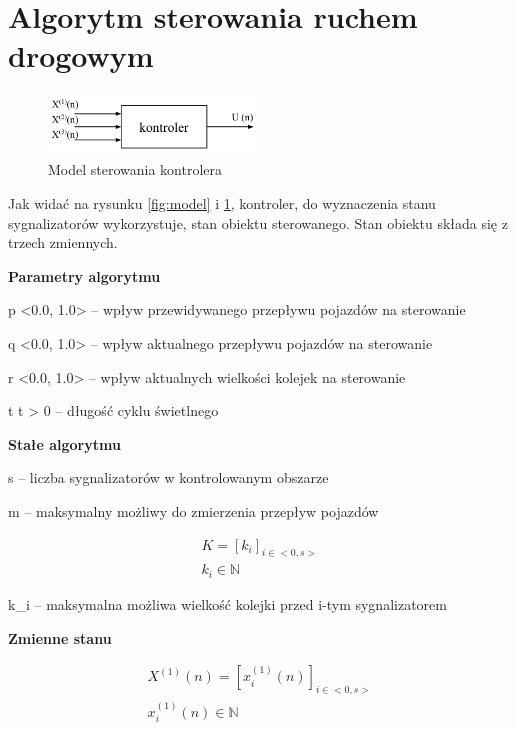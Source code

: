 \section{Algorytm sterowania ruchem drogowym}
\begin{figure}[h]
    \centering
    \includegraphics[width=0.5\textwidth]{images/kontroler.pdf}
    \caption{Model sterowania kontrolera}
    \label{fig:kontroler}
\end{figure}

Jak widać na rysunku \ref{fig:model} i \ref{fig:kontroler}, kontroler, do wyznaczenia stanu sygnalizatorów wykorzystuje, stan obiektu sterowanego. Stan obiektu składa się z trzech zmiennych.

\vspace{1.5cm}
\textbf{Parametry algorytmu}

p \in <0.0, 1.0> \textrm{ -- wpływ przewidywanego przepływu pojazdów na sterowanie}

q \in <0.0, 1.0> \textrm{ -- wpływ aktualnego przepływu pojazdów na sterowanie}

r \in <0.0, 1.0> \textrm{ -- wpływ aktualnych wielkości kolejek na sterowanie}

t \in {} \textrm{ } t > 0 \textrm{ -- długość cyklu świetlnego}

\vspace{1.5cm}
\textbf{Stałe algorytmu}

s \in {} \textrm{ -- liczba sygnalizatorów w kontrolowanym obszarze}

m \in {} \textrm{ -- maksymalny możliwy do zmierzenia przepływ pojazdów}

\begin{equation}
	\begin{array}{c}
		K = \left[ k_{i} \right]_{i \in <0,s>}\\
		k_{i} \in \mathbb{N}
	\end{array}
\end{equation}

k_{i} \textrm{ -- maksymalna możliwa wielkość kolejki przed i-tym sygnalizatorem}

\vspace{1.5cm}
\textbf{Zmienne stanu}

\begin{equation}
	\begin{array}{c}
		X^{(1)} (n) = \left[ x^{(1)}_{i} (n) \right]_{i \in <0,s>}\\
		x^{(1)}_{i} (n) \in \mathbb{N}
	\end{array}
\end{equation}

